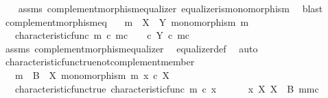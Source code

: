 \begin{isabellebody}
\ \ %
\endisadelimproof
%
\isatagproof
{}\isamarkupfalse%
\ assms\ complement{\isacharunderscore}{\kern0pt}morphism{\isacharunderscore}{\kern0pt}equalizer\ equalizer{\isacharunderscore}{\kern0pt}is{\isacharunderscore}{\kern0pt}monomorphism\ \isamarkupfalse%
\ blast%
\endisatagproof
{\isafoldproof}%
%
\isadelimproof
\isanewline
%
\endisadelimproof
\isanewline
{}\isamarkupfalse%
\ complement{\isacharunderscore}{\kern0pt}morphism{\isacharunderscore}{\kern0pt}eq{\isacharcolon}{\kern0pt}\isanewline
\ \ \ {\isachardoublequoteopen}m\ {\isacharcolon}{\kern0pt}\ X\ {\isasymrightarrow}\ Y{\isachardoublequoteclose}\ {\isachardoublequoteopen}monomorphism\ m{\isachardoublequoteclose}\isanewline
\ \ \ {\isachardoublequoteopen}characteristic{\isacharunderscore}{\kern0pt}func\ m\ {\isasymcirc}\isactrlsub c\ m\isactrlsup c\ \ {\isacharequal}{\kern0pt}\ {\isacharparenleft}{\kern0pt}{\isasymf}\ {\isasymcirc}\isactrlsub c\ {\isasymbeta}\isactrlbsub Y\isactrlesub {\isacharparenright}{\kern0pt}\ {\isasymcirc}\isactrlsub c\ m\isactrlsup c{\isachardoublequoteclose}\isanewline
%
\isadelimproof
\ \ %
\endisadelimproof
%
\isatagproof
{}\isamarkupfalse%
\ assms\ complement{\isacharunderscore}{\kern0pt}morphism{\isacharunderscore}{\kern0pt}equalizer\ \isamarkupfalse%
\ equalizer{\isacharunderscore}{\kern0pt}def\ \isamarkupfalse%
\ auto%
\endisatagproof
{\isafoldproof}%
%
\isadelimproof
\isanewline
%
\endisadelimproof
\isanewline
{}\isamarkupfalse%
\ characteristic{\isacharunderscore}{\kern0pt}func{\isacharunderscore}{\kern0pt}true{\isacharunderscore}{\kern0pt}not{\isacharunderscore}{\kern0pt}complement{\isacharunderscore}{\kern0pt}member{\isacharcolon}{\kern0pt}\isanewline
\ \ \ {\isachardoublequoteopen}m\ {\isacharcolon}{\kern0pt}\ B\ {\isasymrightarrow}\ X{\isachardoublequoteclose}\ {\isachardoublequoteopen}monomorphism\ m{\isachardoublequoteclose}\ {\isachardoublequoteopen}x\ {\isasymin}\isactrlsub c\ X{\isachardoublequoteclose}\isanewline
\ \ \ characteristic{\isacharunderscore}{\kern0pt}func{\isacharunderscore}{\kern0pt}true{\isacharcolon}{\kern0pt}\ {\isachardoublequoteopen}characteristic{\isacharunderscore}{\kern0pt}func\ m\ {\isasymcirc}\isactrlsub c\ x\ {\isacharequal}{\kern0pt}\ {\isasymt}{\isachardoublequoteclose}\isanewline
\ \ \ {\isachardoublequoteopen}{\isasymnot}\ x\ {\isasymin}\isactrlbsub X\isactrlesub \ {\isacharparenleft}{\kern0pt}X\ {\isasymsetminus}\ {\isacharparenleft}{\kern0pt}B{\isacharcomma}{\kern0pt}\ m{\isacharparenright}{\kern0pt}{\isacharcomma}{\kern0pt}m\isactrlsup c{\isacharparenright}{\kern0pt}{\isachardoublequoteclose}\isanewline

\end{isabellebody}
